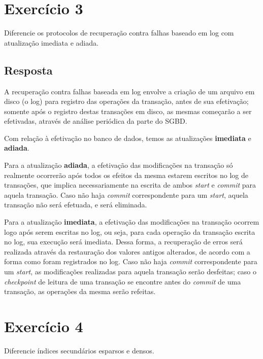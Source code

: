 \documentclass[article, a4paper, oneside, 11pt, english, brazil, sumario=tradicional]{abntex2}
\begin{document}
\section{Exercício 3}
\label{sec:org0167df3}

Diferencie  os  protocolos de  recuperação  contra  falhas  baseado em  log  com
atualização imediata e adiada.

\subsection{Resposta}
\label{sec:org6af8632}

A recuperação contra  falhas baseada em log  envolve a criação de  um arquivo em
disco (o log) para registro das operações da transação, antes de sua efetivação;
somente após  o registro destas transações  em disco, as mesmas  começarão a ser
efetivadas, através de análise periódica da parte do SGBD.

Com relação à  efetivação no banco de dados, temos  as atualizações \textbf{imediata} e
\textbf{adiada}.

Para  a atualização  \textbf{adiada}, a  efetivação  das modificações  na transação  só
realmente ocorrerão  após todos os efeitos  da mesma estarem escritos  no log de
transações, que implica  necessariamente na escrita de ambos  \emph{start} e \emph{commit}
para aquela  transação. Caso não  haja \emph{commit} correspondente para  um \emph{start},
aquela transação não será efetuada, e será eliminada.

Para  a  atualização \textbf{imediata},  a  efetivação  das modificações  na  transação
ocorrem  logo  após serem  escritas  no  log, ou  seja,  para  cada operação  da
transação escrita no log, sua execução será imediata. Dessa forma, a recuperação
de erros será realizada através da restauração dos valores antigos alterados, de
acordo  com a  forma  como foram  registrados  no log.  Caso  não haja  \emph{commit}
correspondente para um \emph{start}, as modificações realizadas para aquela transação
serão desfeitas;  caso o \emph{checkpoint}  de leitura  de uma transação  se encontre
antes do \emph{commit} de uma transação, as operações da mesma serão refeitas.

\section{Exercício 4}
\label{sec:org49f5af0}

Diferencie índices secundários esparsos e densos.
\end{document}
